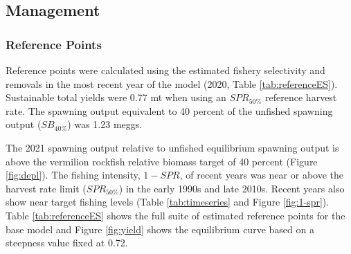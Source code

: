 \documentclass[11pt,
  english,
  a4paper,
]{article}
\begin{document}
\leavevmode\tagmcend\tagstructend\par


\hypertarget{management}{%
\subsection{Management}\label{management}}

\leavevmode\tagmcend\tagstructend


\hypertarget{reference-points-1}{%
\subsubsection{Reference Points}\label{reference-points-1}}

\leavevmode\tagmcend\tagstructend


Reference points were calculated using the estimated fishery selectivity and removals in the most recent year of the model (2020, Table \ref{tab:referenceES}). Sustainable total yields were 0.77 mt when using an {\(SPR_{50\%}\)\leavevmode\tagmcend\tagstructend} reference harvest rate. The spawning output equivalent to 40 percent of the unfished spawning output ({\(SB_{40\%}\)\leavevmode\tagmcend\tagstructend}) was 1.23 meggs.

\leavevmode\tagmcend\tagstructend\par


The 2021 spawning output relative to unfished equilibrium spawning output is above the vermilion rockfish relative biomass target of 40 percent (Figure \ref{fig:depl}). The fishing intensity, {\(1-SPR\)\leavevmode\tagmcend\tagstructend}, of recent years was near or above the harvest rate limit ({\(SPR_{50\%}\)\leavevmode\tagmcend\tagstructend}) in the early 1990s and late 2010s. Recent years also show near target fishing levels (Table \ref{tab:timeseries} and Figure \ref{fig:1-spr}). Table \ref{tab:referenceES} shows the full suite of estimated reference points for the base model and Figure \ref{fig:yield} shows the equilibrium curve based on a steepness value fixed at 0.72.
\end{document}
